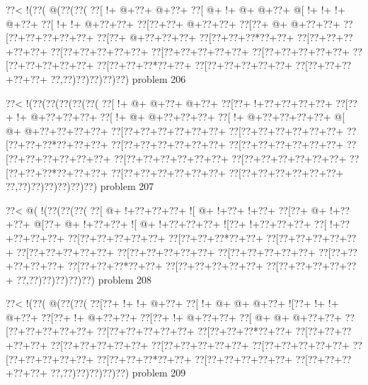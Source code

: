 \vbox{\vbox{\goo
\0??<\- !(\0??(\- @(\0??(\0??(
\0??[\- !+\- @+\0??+\- @+\0??+
\0??[\- @+\- !+\- @+\- @+\0??+
\- @[\- !+\- !+\- !+\- @+\0??+
\0??[\- !+\- !+\- @+\0??+\0??+
\0??[\0??+\0??+\- @+\0??+\0??+
\0??[\0??+\- @+\- @+\0??+\0??+
\0??[\0??+\0??+\0??+\0??+\0??+
\0??[\0??+\- @+\0??+\0??+\0??+
\0??[\0??+\0??+\0??*\0??+\0??+
\0??[\0??+\0??+\0??+\0??+\0??+
\0??[\0??+\0??+\0??+\0??+\0??+
\0??[\0??+\0??+\0??+\0??+\0??+
\0??[\0??+\0??+\0??+\0??+\0??+
\0??[\0??+\0??+\0??+\0??+\0??+
\0??[\0??+\0??+\0??*\0??+\0??+
\0??[\0??+\0??+\0??+\0??+\0??+
\0??[\0??+\0??+\0??+\0??+\0??+
\0??,\0??)\0??)\0??)\0??)\0??)
}
\hfil problem 206\hfil\break
}

\vbox{\vbox{\goo
\0??<\- !(\0??(\0??(\0??(\0??(\0??(
\0??[\- !+\- @+\- @+\0??+\- @+\0??+
\0??[\0??+\- !+\0??+\0??+\0??+\0??+
\0??[\0??+\- !+\- @+\0??+\0??+\0??+
\0??[\- !+\- @+\- @+\0??+\0??+\0??+
\0??[\- !+\- @+\0??+\0??+\0??+\0??+
\- @[\- @+\- @+\0??+\0??+\0??+\0??+
\0??[\0??+\0??+\0??+\0??+\0??+\0??+
\0??[\0??+\0??+\0??+\0??+\0??+\0??+
\0??[\0??+\0??+\0??*\0??+\0??+\0??+
\0??[\0??+\0??+\0??+\0??+\0??+\0??+
\0??[\0??+\0??+\0??+\0??+\0??+\0??+
\0??[\0??+\0??+\0??+\0??+\0??+\0??+
\0??[\0??+\0??+\0??+\0??+\0??+\0??+
\0??[\0??+\0??+\0??+\0??+\0??+\0??+
\0??[\0??+\0??+\0??*\0??+\0??+\0??+
\0??[\0??+\0??+\0??+\0??+\0??+\0??+
\0??[\0??+\0??+\0??+\0??+\0??+\0??+
\0??,\0??)\0??)\0??)\0??)\0??)\0??)
}
\hfil problem 207\hfil\break
}

\vbox{\vbox{\goo
\0??<\- @(\- !(\0??(\0??(\0??(
\0??[\- @+\- !+\0??+\0??+\0??+
\- ![\- @+\- !+\0??+\- !+\0??+
\0??[\0??+\- @+\- !+\0??+\0??+
\- @[\0??+\- @+\- !+\0??+\0??+
\- ![\- @+\- !+\0??+\0??+\0??+
\- ![\0??+\- !+\0??+\0??+\0??+
\0??[\- !+\0??+\0??+\0??+\0??+
\0??[\0??+\0??+\0??+\0??+\0??+
\0??[\0??+\0??+\0??*\0??+\0??+
\0??[\0??+\0??+\0??+\0??+\0??+
\0??[\0??+\0??+\0??+\0??+\0??+
\0??[\0??+\0??+\0??+\0??+\0??+
\0??[\0??+\0??+\0??+\0??+\0??+
\0??[\0??+\0??+\0??+\0??+\0??+
\0??[\0??+\0??+\0??*\0??+\0??+
\0??[\0??+\0??+\0??+\0??+\0??+
\0??[\0??+\0??+\0??+\0??+\0??+
\0??,\0??)\0??)\0??)\0??)\0??)
}
\hfil problem 208\hfil\break
}

\vbox{\vbox{\goo
\0??<\- !(\0??(\- @(\0??(\0??(
\0??[\0??+\- !+\- !+\- @+\0??+
\0??[\- !+\- @+\- @+\- @+\0??+
\- ![\0??+\- !+\- !+\- @+\0??+
\0??[\0??+\- !+\- @+\0??+\0??+
\0??[\0??+\- !+\- @+\0??+\0??+
\0??[\- @+\- @+\- @+\0??+\0??+
\0??[\0??+\0??+\0??+\0??+\0??+
\0??[\0??+\0??+\0??+\0??+\0??+
\0??[\0??+\0??+\0??*\0??+\0??+
\0??[\0??+\0??+\0??+\0??+\0??+
\0??[\0??+\0??+\0??+\0??+\0??+
\0??[\0??+\0??+\0??+\0??+\0??+
\0??[\0??+\0??+\0??+\0??+\0??+
\0??[\0??+\0??+\0??+\0??+\0??+
\0??[\0??+\0??+\0??*\0??+\0??+
\0??[\0??+\0??+\0??+\0??+\0??+
\0??[\0??+\0??+\0??+\0??+\0??+
\0??,\0??)\0??)\0??)\0??)\0??)
}
\hfil problem 209\hfil\break
}

